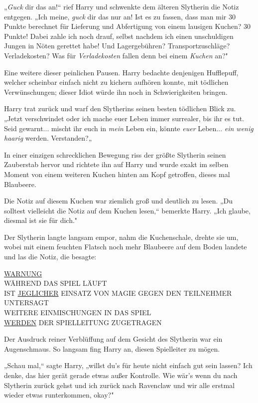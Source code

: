 {„\emph{Guck} dir das an!“ rief Harry und schwenkte dem älteren Slytherin die Notiz entgegen. „Ich meine, \emph{guck} dir das nur an! Ist es zu fassen, dass man mir 30 Punkte berechnet für Lieferung und Abfertigung von einem lausigen Kuchen? 30 Punkte! Dabei zahle ich noch drauf, selbst nachdem ich einen unschuldigen Jungen in Nöten gerettet habe! Und Lagergebühren? Transportzuschläge? Verladekosten? Was für \emph{Verladekosten} fallen denn bei einem \emph{Kuchen} an?"

Eine weitere dieser peinlichen Pausen. Harry bedachte denjenigen Hufflepuff, welcher scheinbar einfach nicht zu kichern aufhören konnte, mit tödlichen Verwünschungen; dieser Idiot würde ihn noch in Schwierigkeiten bringen.

Harry trat zurück und warf den Slytherins seinen besten tödlichen Blick zu. „Jetzt verschwindet oder ich mache euer Leben immer surrealer, bis ihr es tut. Seid gewarnt... mischt ihr euch in \emph{mein} Leben ein, könnte \emph{euer} Leben... \emph{ein wenig haarig} werden. Verstanden?„

In einer einzigen schrecklichen Bewegung riss der größte Slytherin seinen Zauberstab hervor und richtete ihn auf Harry und wurde exakt im selben Moment von einem weiteren Kuchen hinten am Kopf getroffen, dieses mal Blaubeere.

Die Notiz auf diesem Kuchen war ziemlich groß und deutlich zu lesen. „Du solltest vielleicht die Notiz auf dem Kuchen lesen,“ bemerkte Harry. „Ich glaube, diesmal ist sie für dich."

Der Slytherin langte langsam empor, nahm die Kuchenschale, drehte sie um, wobei mit einem feuchten Flatsch noch mehr Blaubeere auf dem Boden landete und las die Notiz, die besagte:

\uline{WARNUNG}\\ WÄHREND DAS SPIEL LÄUFT\\ IST \uline{JEGLICHER} EINSATZ VON MAGIE GEGEN DEN TEILNEHMER UNTERSAGT\\ WEITERE EINMISCHUNGEN IN DAS SPIEL\\ \uline{WERDEN} DER SPIELLEITUNG ZUGETRAGEN

Der Ausdruck reiner Verblüffung auf dem Gesicht des Slytherin war ein Augenschmaus. So langsam fing Harry an, diesen Spielleiter zu mögen.

„Schau mal,“ sagte Harry, „willst du's für heute nicht einfach gut sein lassen? Ich denke, das hier gerät gerade etwas außer Kontrolle. Wie wär's wenn du nach Slytherin zurück gehst und ich zurück nach Ravenclaw und wir alle erstmal wieder etwas runterkommen, okay?"

}
